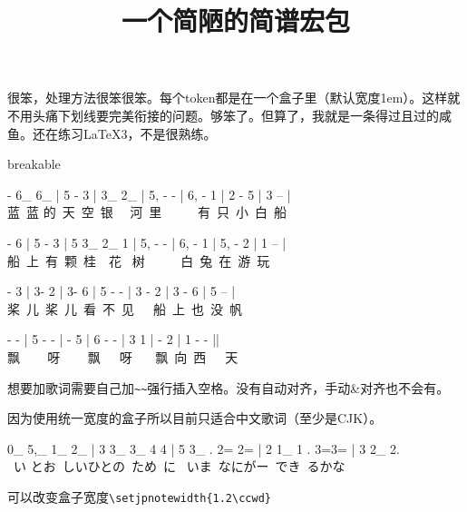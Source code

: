 \documentclass[11pt,fontset=ubuntu]{ctexart}
\title{一个简陋的简谱宏包}
\author{}
\date{}
\begin{document}
\maketitle

很笨，处理方法很笨很笨。每个token都是在一个盒子里（默认宽度1em）。这样就不用头痛下划线要完美衔接的问题。够笨了。但算了，我就是一条得过且过的咸鱼。还在练习\LaTeX3，不是很熟练。

\begin{tcblisting}{breakable}
\begin{jianpu}
 - {6_} {6_}  | 5 - 3 |  {3_} {2_}  |
{5,} - - | {6,} - 1 | 2 - 5 | 3 -- | \\
\rmfamily 蓝~蓝 的~天~空~银~~ 河~里 ~ ~ ~  有~只~小~白~船

 - 6  | 5 - 3 | 5 {3_} {2_} 1 | {5,} - - |
{6,} - 1 | {5,} - 2 | 1 -- | \\
\rmfamily 船~上~有~颗~桂~~花~ 树 ~ ~ ~ 白~兔~在~游~玩

- 3 | 3- 2 | 3- 6 | 5 - - | 3 - 2 | 3 - 6 | 5 -- |\\
\rmfamily 桨~儿~桨~儿~看~不~见~~~船~上~也~没~帆

 - - | 5 - - |  - {5} \slurE |
6 - - |  3 1 \slurE |  - 2 \slurE | 1 - - {||}\\
\rmfamily 飘 ~~~ 呀 ~~~ 飘~~~呀~~~ 飘~向~西~~~天
\end{jianpu}
\end{tcblisting}


想要加歌词需要自己加\verb|~~|强行插入空格。没有自动对齐，手动\&对齐也不会有。

因为使用统一宽度的盒子所以目前只适合中文歌词（至少是CJK）。

\begin{tcblisting}{}
\begin{jianpu}
{0_} {5,_} \; {1_} {2_} | 3 {3_} {3_} 4 4 | 5
 {3_} . {2=} {2=} |
2 {1_}  1 \slurE .  {3=}{3=} | 3 {2_} 2. \\
~い \; とお~しいひとの~ため~に~ いま~なにがー~でき~るかな
\end{jianpu}
\end{tcblisting}

可以改变盒子宽度\verb|\setjpnotewidth{1.2\ccwd}|

\begin{tcblisting}{}
\setjpnotewidth{1.2\ccwd}
\end{tcblisting}
\end{document}
